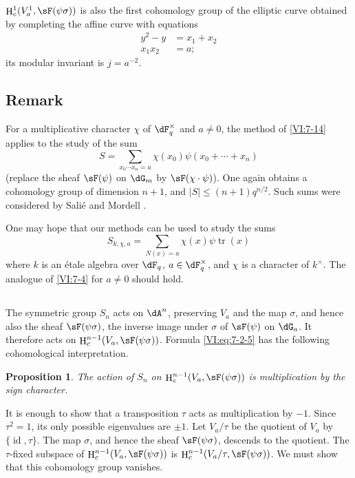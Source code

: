 \documentclass[12pt,oneside,english]{smfbook}
\DeclareMathOperator{\h}{H}
\DeclareMathOperator{\tr}{tr}
\newcounter{char}
\newtheorem{proposition_}[subsection]{Proposition}
\begin{document}
$\h_c^1(V_a^1,\sF(\psi\sigma))$ is also the first cohomology group of the elliptic curve obtained by completing the affine curve with equations
\begin{align*}
  y^2-y &= x_1+x_2 \\
  x_1 x_2 &= a \text{;}
\end{align*}
its modular invariant is $j=a^{-2}$.

\subsection{Remark}\label{VI:7-18}

For a multiplicative character $\chi$ of $\dF_q^\times$ and $a\ne0$, the method of \ref{VI:7-14} applies to the study of the sum
\[
  S=\sum_{x_0\dotsm x_n=a}\chi(x_0)\psi(x_0+\cdots+x_n)
\]
(replace the sheaf $\sF(\psi)$ on $\dG_m$ by $\sF(\chi\cdot\psi)$). One again obtains a cohomology group of dimension $n+1$, and $|S|\leqslant(n+1)q^{n/2}$. Such sums were considered by Salié and Mordell \cite{mo73}.

One may hope that our methods can be used to study the sums
\[
  S_{k,\chi,a} = \sum_{N(x)=a} \chi(x) \psi \tr(x)
\]
where $k$ is an étale algebra over $\dF_q$, $a\in\dF_q^\times$, and $\chi$ is a character of $k^\times$. The analogue of \ref{VI:7-4} for $a\ne0$ should hold.

\subsection{}\label{VI:7-19}

The symmetric group $S_n$ acts on $\dA^n$, preserving $V_a$ and the map $\sigma$, and hence also the sheaf $\sF(\psi\sigma)$, the inverse image under $\sigma$ of $\sF(\psi)$ on $\dG_a$. It therefore acts on $\h_c^{n-1}(V_a,\sF(\psi\sigma))$. Formula \eqref{VI:eq:7-2-5} has the following cohomological interpretation.

\begin{proposition_}\label{VI:7-20}
The action of $S_n$ on $\h_c^{n-1}(V_a,\sF(\psi\sigma))$ is multiplication by the sign character.
\end{proposition_}

It is enough to show that a transposition $\tau$ acts as multiplication by $-1$. Since $\tau^2=1$, its only possible eigenvalues are $\pm1$. Let $V_a/\tau$ be the quotient of $V_a$ by $\{\operatorname{id},\tau\}$. The map $\sigma$, and hence the sheaf $\sF(\psi\sigma)$, descends to the quotient. The $\tau$-fixed subspace of $\h_c^{n-1}(V_a,\sF(\psi\sigma))$ is $\h_c^{n-1}(V_a/\tau,\sF(\psi\sigma))$. We must show that this cohomology group vanishes.
\end{document}
